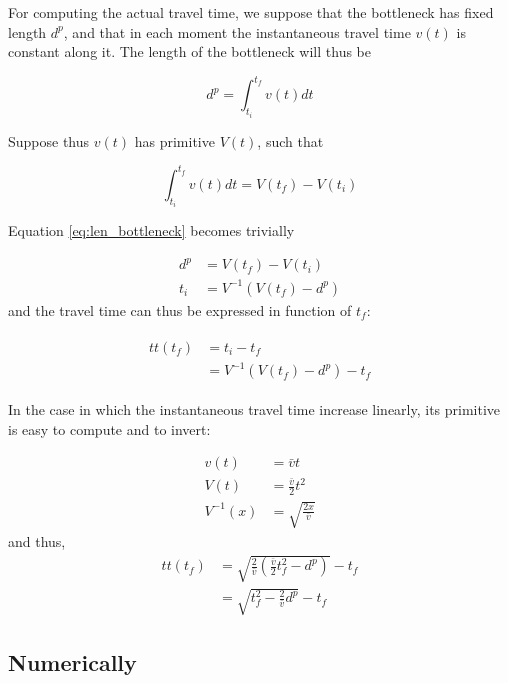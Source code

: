 \documentclass{article}
\begin{document}
For computing the actual travel time, we suppose that the bottleneck has fixed length \(d^p\),
and that in each moment the instantaneous travel time \(v(t)\) is constant along it.
The length of the bottleneck will thus be

\begin{equation}
  \label{eq:len_bottleneck}
  d^p = \int_{t_i}^{t_f}v(t) dt
\end{equation}

Suppose thus \(v(t)\) has primitive \(V(t)\), such that

\begin{equation}
  \label{eq:primitive}
  \int_{t_i}^{t_f}v(t) dt = V(t_f) - V(t_i)
\end{equation}

Equation \eqref{eq:len_bottleneck} becomes trivially

\begin{align*}
  d^p & = V(t_f) - V(t_i) \\
  t_i & = V^{-1}(V(t_f) - d^p)
\end{align*}
and the travel time can thus be expressed in function of \(t_f\):

\begin{align*}
  \begin{split}
    \label{eq:travel_time}
    tt(t_f) & = t_i - t_f \\
    & = V^{-1}(V(t_f) - d^p) - t_f
  \end{split}
\end{align*}

In the case in which the instantaneous travel time increase linearly, its primitive is easy to compute and to invert:

\begin{align*}
  v(t) & = \bar{v}t \\
  V(t) & = \frac{\bar{v}}{2}t^2 \\
  V^{-1}(x) & = \sqrt{\frac{2x}{\bar{v}}}
\end{align*}
and thus,
\begin{align*}
  tt(t_f) & = \sqrt{\frac{2}{\bar{v}}\left(\frac{\bar{v}}{2}t_f^2 - d^p\right)} - t_f \\
  & = \sqrt{t_f^2 - \frac{2}{\bar{v}}d^p} - t_f
\end{align*}

\subsection{Numerically}
\end{document}
